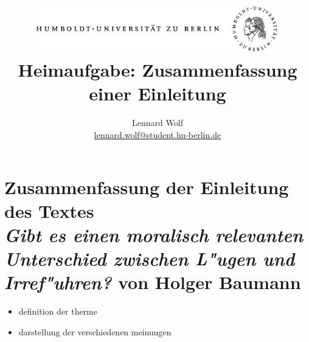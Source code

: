 \documentclass[a4paper]{article}
\begin{document}
\title{
	\includegraphics*[width=0.79\textwidth]{images/hu_logo.png}\\
	\vspace{24pt}
	Heimaufgabe: Zusammenfassung einer Einleitung}
\author{Lennard Wolf\\
        \href{mailto:lennard.wolf@student.hu-berlin.de}{lennard.wolf@student.hu-berlin.de}}
\maketitle
\newpage


\section*{Zusammenfassung der Einleitung des Textes \\ \emph{Gibt es einen moralisch relevanten Unterschied zwischen L"ugen und Irref"uhren?} von Holger Baumann}





\begin{itemize}
  \item definition der therme
  \item darstellung der verschiedenen meinungen 
\end{itemize}
\newpage

\end{document}
